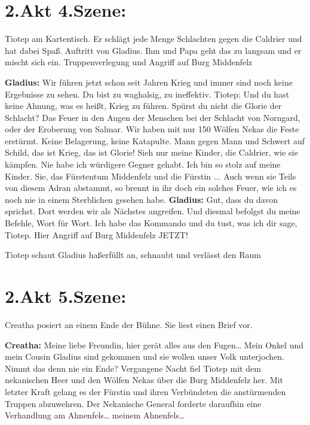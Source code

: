 \documentclass[a5paper,6pt]{book}
\begin{document}
\section{2.Akt 4.Szene:}

Tiotep am Kartentisch. Er schlägt jede Menge Schlachten gegen die Caldrier und hat dabei
Spaß. Auftritt von Gladius. Ihm und Papa geht das zu langsam und er mischt sich ein.
Truppenverlegung und Angriff auf Burg Middenfelz

\textbf{Gladius:} Wir führen jetzt schon seit Jahren Krieg und immer sind noch keine Ergebnisse zu
sehen. Du bist zu waghalsig, zu ineffektiv.
Tiotep: Und du hast keine Ahnung, was es heißt, Krieg zu führen. Spürst du nicht die Glorie
der Schlacht? Das Feuer in den Augen der Menschen bei der Schlacht von Norngard,
oder der Eroberung von Salmar. Wir haben mit nur 150 Wölfen Nekas die Feste
erstürmt. Keine Belagerung, keine Katapulte. Mann gegen Mann und Schwert auf
Schild, das ist Krieg, das ist Glorie! Sieh nur meine Kinder, die Caldrier, wie sie
kämpfen. Nie habe ich würdigere Gegner gehabt. Ich bin so stolz auf meine Kinder.
Sie, das Fürstentum Middenfelz und die Fürstin ... Auch wenn sie Teils von diesem
Adran abstammt, so brennt in ihr doch ein solches Feuer, wie ich es noch nie in einem
Sterblichen gesehen habe.
\textbf{Gladius:} Gut, dass du davon sprichst. Dort werden wir als Nächstes angreifen. Und diesmal
befolgst du meine Befehle, Wort für Wort. Ich habe das Kommando und du tust, was
ich dir sage, Tiotep. Hier Angriff auf Burg Middenfelz JETZT!

Tiotep schaut Gladius haßerfüllt an, schnaubt und verlässt den Raum

\section{2.Akt 5.Szene:}

Creatha posiert an einem Ende der Bühne. Sie liest einen Brief vor.

\textbf{Creatha:} Meine liebe Freundin, hier gerät alles aus den Fugen… Mein Onkel und mein
Cousin Gladius sind gekommen und sie wollen unser Volk unterjochen. Nimmt das
denn nie ein Ende? Vergangene Nacht fiel Tiotep mit dem nekanischen Heer und den
Wölfen Nekas über die Burg Middenfelz her. Mit letzter Kraft gelang es der Fürstin
und ihren Verbündeten die anstürmenden Truppen abzuwehren. Der Nekanische
General forderte daraufhin eine Verhandlung am Ahnenfels… meinem Ahnenfels…
\end{document}
